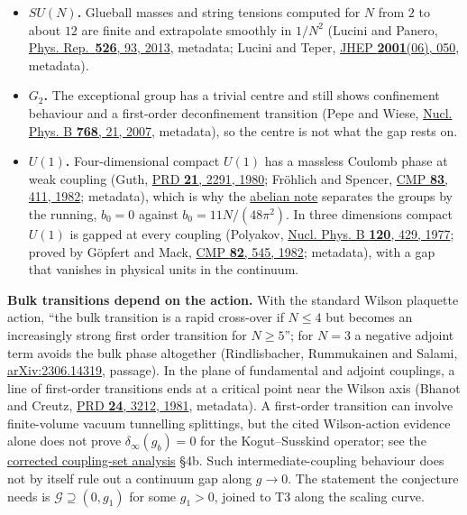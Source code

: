 \documentclass[11pt,a4paper]{article}
\newcommand{\tightlist}{\setlength{\itemsep}{0pt}\setlength{\parskip}{0pt}}
\begin{document}
\begin{itemize}
\tightlist
\item
  \textbf{\(SU(N)\).} Glueball masses and string tensions computed for
  \(N\) from \(2\) to about \(12\) are finite and extrapolate smoothly
  in \(1/N^2\) (Lucini and Panero,
  \href{https://doi.org/10.1016/j.physrep.2013.01.001}{Phys.
  Rep.~\textbf{526}, 93, 2013}, metadata; Lucini and Teper,
  \href{https://doi.org/10.1088/1126-6708/2001/06/050}{JHEP
  \textbf{2001}(06), 050}, metadata).
\item
  \textbf{\(G_2\).} The exceptional group has a trivial centre and still
  shows confinement behaviour and a first-order deconfinement transition
  (Pepe and Wiese,
  \href{https://doi.org/10.1016/j.nuclphysb.2006.12.024}{Nucl. Phys. B
  \textbf{768}, 21, 2007}, metadata), so the centre is not what the gap
  rests on.
\item
  \textbf{\(U(1)\).} Four-dimensional compact \(U(1)\) has a massless
  Coulomb phase at weak coupling (Guth,
  \href{https://doi.org/10.1103/PhysRevD.21.2291}{PRD \textbf{21}, 2291,
  1980}; Fröhlich and Spencer,
  \href{https://doi.org/10.1007/BF01213610}{CMP \textbf{83}, 411, 1982};
  metadata), which is why the
  \href{strong-coupling-uniform-gap.md}{abelian note} separates the
  groups by the running, \(b_0=0\) against \(b_0=11N/(48\pi^2)\). In
  three dimensions compact \(U(1)\) is gapped at every coupling
  (Polyakov, \href{https://doi.org/10.1016/0550-3213(77)90086-4}{Nucl.
  Phys. B \textbf{120}, 429, 1977}; proved by Göpfert and Mack,
  \href{https://doi.org/10.1007/BF01961240}{CMP \textbf{82}, 545, 1982};
  metadata), with a gap that vanishes in physical units in the
  continuum.
\end{itemize}

\textbf{Bulk transitions depend on the action.} With the standard Wilson
plaquette action, ``the bulk transition is a rapid cross-over if
\(N\le4\) but becomes an increasingly strong first order transition for
\(N\ge5\)''; for \(N=3\) a negative adjoint term avoids the bulk phase
altogether (Rindlisbacher, Rummukainen and Salami,
\href{https://arxiv.org/abs/2306.14319}{arXiv:2306.14319}, passage). In
the plane of fundamental and adjoint couplings, a line of first-order
transitions ends at a critical point near the Wilson axis (Bhanot and
Creutz, \href{https://doi.org/10.1103/PhysRevD.24.3212}{PRD \textbf{24},
3212, 1981}, metadata). A first-order transition can involve
finite-volume vacuum tunnelling splittings, but the cited Wilson-action
evidence alone does not prove \(\delta_\infty(g_b)=0\) for the
Kogut--Susskind operator; see the
\href{mass-gap-obligations-lattice.md}{corrected coupling-set analysis}
§4b. Such intermediate-coupling behaviour does not by itself rule out a
continuum gap along \(g\to0\). The statement the conjecture needs is
\(\mathcal G\supseteq(0,g_1)\) for some \(g_1>0\), joined to T3 along
the scaling curve.
\end{document}
